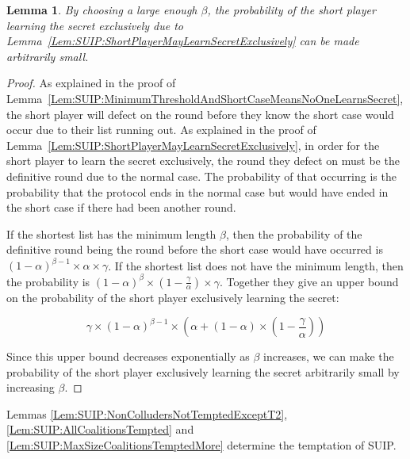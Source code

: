 \documentclass[12pt]{dalcsthesis}
\newtheorem{lemma}{Lemma}
\begin{document}
\begin{lemma}\label{Lem:SUIP:ShortPlayerLearningSecretExclusivelyIsReducible}By choosing a large enough $\beta$, the probability of the short player learning the secret exclusively due to Lemma~\ref{Lem:SUIP:ShortPlayerMayLearnSecretExclusively} can be made arbitrarily small.\end{lemma} 
\begin{proof}
As explained in the proof of Lemma~\ref{Lem:SUIP:MinimumThresholdAndShortCaseMeansNoOneLearnsSecret}, the short player will defect on the round before they know the short case would occur due to their list running out. As explained in the proof of Lemma~\ref{Lem:SUIP:ShortPlayerMayLearnSecretExclusively}, in order for the short player to learn the secret exclusively, the round they defect on must be the definitive round due to the normal case. The probability of that occurring is the probability that the protocol ends in the normal case but would have ended in the short case if there had been another round.

If the shortest list has the minimum length $\beta$, then the probability of the definitive round being the round before the short case would have occurred is $(1-\alpha)^{\beta-1} \times \alpha \times \gamma$. If the shortest list does not have the minimum length, then the probability is $(1-\alpha)^\beta \times (1 - \frac{\gamma}{\alpha}) \times \gamma$. Together they give an upper bound on the probability of the short player exclusively learning the secret:

$$\gamma \times (1-\alpha)^{\beta-1} \times (\alpha + (1-\alpha) \times (1 - \frac{\gamma}{\alpha}))$$

Since this upper bound decreases exponentially as $\beta$ increases, we can make the probability of the short player exclusively learning the secret arbitrarily small by increasing $\beta$.
\end{proof}

Lemmas \ref{Lem:SUIP:NonColludersNotTemptedExceptT2}, \ref{Lem:SUIP:AllCoalitionsTempted} and \ref{Lem:SUIP:MaxSizeCoalitionsTemptedMore} determine the temptation of SUIP.
\end{document}
